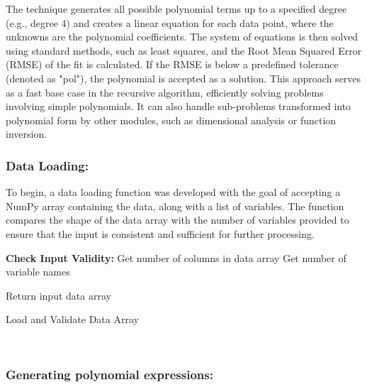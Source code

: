 \documentclass{article}
\begin{document}
The technique generates all possible polynomial terms up to a specified degree (e.g., degree 4) and creates a linear equation for each data point, where the unknowns are the polynomial coefficients. The system of equations is then solved using standard methods, such as least squares, and the Root Mean Squared Error (RMSE) of the fit is calculated. If the RMSE is below a predefined tolerance (denoted as "pol"), the polynomial is accepted as a solution. This approach serves as a fast base case in the recursive algorithm, efficiently solving problems involving simple polynomials. It can also handle sub-problems transformed into polynomial form by other modules, such as dimensional analysis or function inversion.\\



\subsubsection{Data Loading:}

To begin, a data loading function was developed with the goal of accepting a NumPy array containing the data, along with a list of variables. The function compares the shape of the data array with the number of variables provided to ensure that the input is consistent and sufficient for further processing.\\




\begin{algorithm}[H]
\SetAlgoLined
{}

\textbf{Check Input Validity:}\;
Get number of columns in data array\;
Get number of variable names\;


Return input data array\;

\caption{Load and Validate Data Array}
\label{alg:load_data_array} %
\end{algorithm}\\





\subsubsection{Generating polynomial expressions:}
\end{document}
